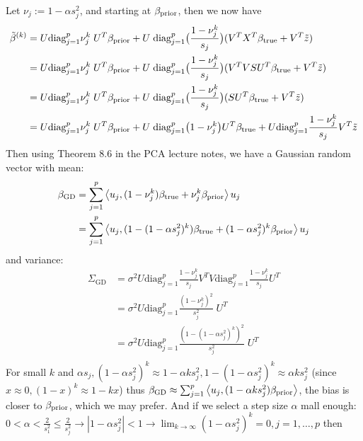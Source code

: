\documentclass[12pt,twoside]{article}
\begin{document}
\begin{enumerate}
\begin{enumerate}
Let $\nu_j := 1 - \alpha s_j^2$, and starting at $ \beta_{\operatorname{prior}}$, then we now have
\begin{align*}
	\tilde{ \beta }^{(k)} 	&= 	  U \text{diag}_{j=1}^p   \nu_j^k \; U^T   \beta_{\operatorname{prior}} + U \;    \text{diag}_{j=1}^p \big(  \frac{ 1 - \nu_j^k} {s_j}  \big) (V^T X^T  \beta_{\operatorname{true}}  + V^T  \tilde{ z })\\
					&= 	  U \text{diag}_{j=1}^p   \nu_j^k \; U^T   \beta_{\operatorname{prior}} + U \;    \text{diag}_{j=1}^p \big(  \frac{ 1 - \nu_j^k} {s_j}  \big) (V^T V S U^T \beta_{\operatorname{true}}  + V^T  \tilde{ z })\\
					&= 	  U \text{diag}_{j=1}^p   \nu_j^k \; U^T   \beta_{\operatorname{prior}} + U \;    \text{diag}_{j=1}^p \big(  \frac{ 1 - \nu_j^k} {s_j}  \big) (S U^T \beta_{\operatorname{true}}  + V^T  \tilde{ z })\\
					&= 	  U \text{diag}_{j=1}^p   \nu_j^k \; U^T   \beta_{\operatorname{prior}} + U \;      \text{diag}_{j=1}^p \big( 1 - \nu_j^k \big)  U^T \beta_{\operatorname{true}} + U  \text{diag}_{j=1}^p \frac{ 1 - \nu_j^k} {s_j}  V^T  \tilde{ z }
\end{align*}	
 Then using Theorem 8.6 in the PCA lecture notes, we have a Gaussian random vector  with mean:
\begin{align*}
	\beta_{\text{GD}} 		&= \sum_{j=1}^p \left \langle u_j, (1 - \nu_j^k)  \beta_{\operatorname{true}} + \nu_j^k \beta_{\operatorname{prior}} \right \rangle u_j \\
						&= \sum_{j=1}^p \left \langle u_j, (1 - (1 - \alpha s_j^2)^k) \beta_{\operatorname{true}} + (1 - \alpha s_j^2)^k \beta_{\operatorname{prior}} \right \rangle u_j \\
\end{align*}
and variance:
\begin{align*} 
	\Sigma_{\text{GD}}			&= \sigma^2 U  \text{diag}_{j=1}^p \frac{1 - \nu_j^k} {s_j}  V^T V  \text{diag}_{j=1}^p \frac{ 1 - \nu_j^k} {s_j}  U^T \\
							&= \sigma^2 U   \text{diag}_{j=1}^p \frac{(1 - \nu_j^k)^2} {s_j^2} \; U^T \\
							&= \sigma^2 U   \text{diag}_{j=1}^p \frac{ (1 - (1 - \alpha s_j^2)^k)^2}  {s_j^2} \; U^T \\
\end{align*}
For small $k$ and $\alpha s_j, (1 - \alpha s_j^2)^k \approx 1 - \alpha k s_j^2, 1 - (1 - \alpha s_j^2)^k \approx  \alpha k s_j^2$ (since $x \approx 0, (1-x)^k \approx 1 -k x$)
thus $\beta_{\text{GD}} \approx  \sum_{j=1}^p \left \langle u_j, (1 - \alpha k s_j^2) \beta_{\operatorname{prior}}\right \rangle$, the bias is closer to $\beta_{\operatorname{prior}}$, which we may prefer.
And if we select a step size $\alpha$ mall enough: $0 < \alpha < \frac{2} {s_1^2} \le \frac{2} {s_j^2} \rightarrow |1 - \alpha s_j^2| < 1 \rightarrow \lim_{k \rightarrow \infty} (1 - \alpha s_j^2)^k =0, j=1, \dots ,p $ then

\end{enumerate}
\end{enumerate}
\end{document}
